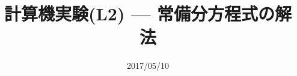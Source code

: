 \documentclass[dvipdfmx]{beamer}
\title{計算機実験(L2) --- 常備分方程式の解法}
\date{2017/05/10}
\begin{document}
\begin{frame}
  \titlepage
  \tableofcontents
\end{frame}






\end{document}
